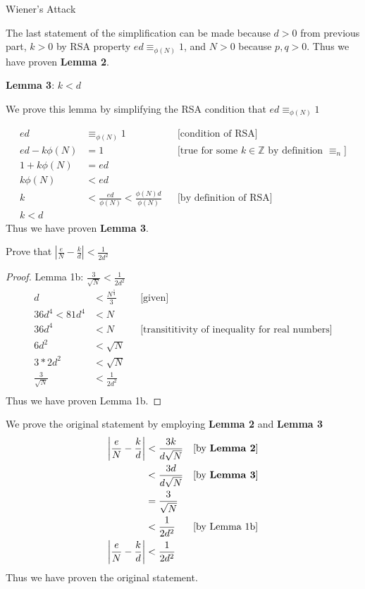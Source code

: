 \documentclass[11pt, nopagenumbers]{adamblan-hw}
\newcommand{\ZZ}{\mathbb{Z}}
\newcommand{\abs}[1]{\left| #1 \right|}
\begin{document}
\begin{question}{\color{red} Wiener's Attack}
\begin{part}
The last statement of the simplification can be made because $d > 0$ from previous part, $k > 0$ by RSA property $ed \equiv_{\phi(N)} 1$, and $N > 0$ because $p, q > 0$.
Thus we have proven \textbf{Lemma 2}.
\end{part}
\pagebreak

\begin{part} \textbf{Lemma 3}: $k < d$

    We prove this lemma by simplifying the RSA condition that $ed \equiv_{\phi(N)} 1$

\begin{align*}
ed &\equiv_{\phi(N)} 1 && \text{[condition of RSA]} \\
ed - k\phi(N) &= 1 && \text{[true for some $k \in \ZZ$ by definition $\equiv_n$]} \\
1 + k\phi(N) &= ed \\
k\phi(N) &< ed \\
k &< \frac{ed}{\phi(N)} < \frac{\phi(N)d}{\phi(N)} && \text{[by definition of RSA]}\\
k < d
\end{align*}
Thus we have proven \textbf{Lemma 3}.
\end{part}
\pagebreak
\begin{part} Prove that $\abs{\frac{e}{N} - \frac{k}{d}} < \frac{1}{2d^2}$

\begin{proof}
Lemma 1b: $\frac{3}{\sqrt{N}} < \frac{1}{2d^2}$ \\

\begin{align*}
d &< \frac{N^{\frac{1}{4}}}{3} && \text{[given]} \\
36d ^ 4 < 81d^4 &< N \\
36d^4 &< N && \text{[transititivity of inequality for real numbers]} \\
6d^2 &< \sqrt{N} \\
3 * 2d^2 &< \sqrt{N} \\
\frac{3}{\sqrt{N}} &< \frac{1}{2d^2} \\
\end{align*}
Thus we have proven Lemma 1b.
\end{proof}
We prove the original statement by employing \textbf{Lemma 2} and \textbf{Lemma 3}
\begin{align*}
\abs{\frac{e}{N} - \frac{k}{d}} &< \frac{3k}{d\sqrt{N}} && \text{[by \textbf{Lemma 2}]}\\
&< \frac{3d}{d\sqrt{N}} && \text{[by \textbf{Lemma 3}]} \\
&= \frac{3}{\sqrt{N}} \\
&< \frac{1}{2d^2} && \text{[by Lemma 1b]} \\
\abs{\frac{e}{N} - \frac{k}{d}} &< \frac{1}{2d^2}
\end{align*}
Thus we have proven the original statement.
\end{part}


\end{question}
\end{document}
